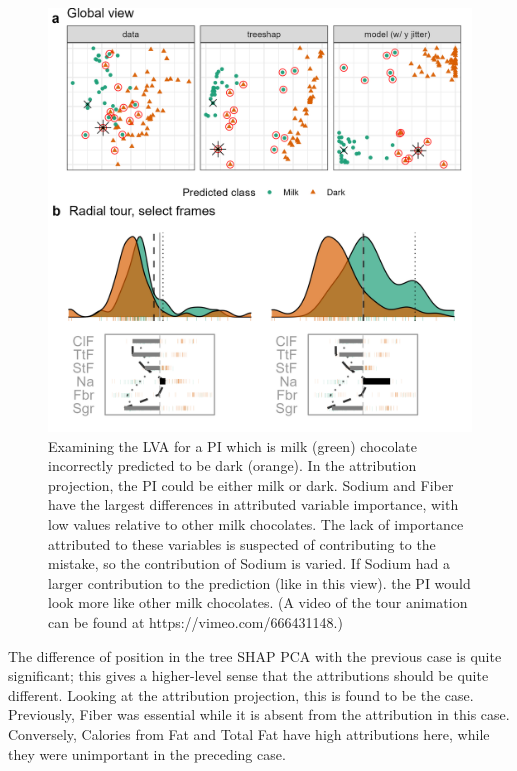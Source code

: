\documentclass[
]{article}
\begin{document}
\begin{figure}

{\centering \includegraphics[width=1\linewidth]{./figures/case_chocolates_inverse} 

}

\caption{Examining the LVA for a PI which is milk (green) chocolate incorrectly predicted to be dark (orange). In the attribution projection, the PI could be either milk or dark. Sodium and Fiber have the largest differences in attributed variable importance, with low values relative to other milk chocolates. The lack of importance attributed to these variables is suspected of contributing to the mistake, so the contribution of Sodium is varied. If Sodium had a larger contribution to the prediction (like in this view). the PI would look more like other milk chocolates. (A video of the tour animation can be found at https://vimeo.com/666431148.)}\label{fig:casechocolatesinverse}
\end{figure}

The difference of position in the tree SHAP PCA with the previous case is quite significant; this gives a higher-level sense that the attributions should be quite different. Looking at the attribution projection, this is found to be the case. Previously, Fiber was essential while it is absent from the attribution in this case. Conversely, Calories from Fat and Total Fat have high attributions here, while they were unimportant in the preceding case.
\end{document}
